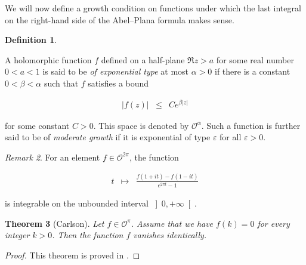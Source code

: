 \documentclass{jams-l}
\newtheorem{theorem}{Theorem}[section]
\theoremstyle{definition}
\newtheorem{definition}[theorem]{Definition}
\theoremstyle{remark}
\newtheorem{remark}[theorem]{Remark}
\numberwithin{equation}{section}
\begin{document}
        We will now define a growth condition on functions under which the last integral on the right-hand side of the Abel--Plana formula makes sense.
        
        \begin{definition}
        \label{DefExpModGrowth}
        
            A holomorphic function $f$ defined on a half-plane $\Re z > a$ for some real number $0 < a < 1$ is said to be \textit{of exponential type} at most $\alpha > 0$ if there is a constant $0 < \beta < \alpha$ such that $f$ satisfies a bound
            
            \[ \begin{array}{ccc}
                    \left \vert f \left( z \right) \right \vert & \leq & C e^{\beta \left \vert z \right \vert}
                \end{array} \]
            
            \noindent for some constant $C > 0$. This space is denoted by $\mathcal{O}^{\alpha}$. Such a function is further said to be of \textit{moderate growth} if it is exponential of type $\varepsilon$ for all $\varepsilon > 0$.
        
        \end{definition}
        
        \begin{remark}
        
            For an element $f \in \mathcal{O}^{2 \pi}$, the function
            
            \[ \begin{array}{ccc}
                    t & \longmapsto & \frac{f \left( 1+it \right) - f \left( 1-it \right)}{e^{2 \pi t} - 1}
                \end{array} \]
            
            \noindent is integrable on the unbounded interval $\left] 0, + \infty \right[$.
        
        \end{remark}
    
        \begin{theorem}[Carlson]
        
            Let $f \in \mathcal{O}^{\pi}$. Assume that we have $f \left( k \right) = 0$ for every integer $k > 0$. Then the function $f$ vanishes identically.
        
        \end{theorem}
        
        \begin{proof}
        
            This theorem is proved in \cite[App. B]{MR3677185}.
        
        \end{proof}
        
\end{document}

